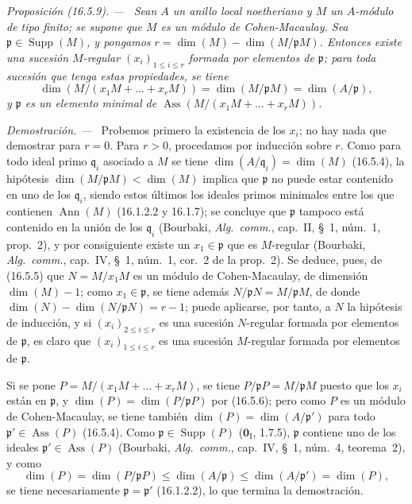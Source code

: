 \documentclass[10pt,oneside]{book}
\makeatletter
\newcommand{\setmanualcurrentlabel}[1]{\def\@currentlabel{#1}}
\newenvironment{proposition}[1][]{%
  \setmanualcurrentlabel{#1}\par\medskip\noindent\itshape Proposición (#1). ---\ }{\par}
\newenvironment{proof}{%
  \par\medskip\noindent\textit{Demostración. ---\ }}{\par}
\providecommand{\setmin}{-}%
\makeatother
\begin{document}
\begin{proposition}[16.5.9]
\label{0.16.5.9-es}
Sean $A$ un anillo local noetheriano y $M$ un $A$-módulo de tipo finito; se
supone que $M$ es un módulo de Cohen-Macaulay. Sea
$\mathfrak{p}\in\operatorname{Supp}(M)$, y pongamos
$r=\dim(M)\setmin\dim(M/\mathfrak{p}M)$. Entonces existe una sucesión $M$-regular
$(x_i)_{1\leq i\leq r}$ formada por elementos de $\mathfrak{p}$; para toda
sucesión que tenga estas propiedades, se tiene
\[
  \dim(M/(x_1M+\ldots+x_rM))
  =\dim(M/\mathfrak{p}M)=\dim(A/\mathfrak{p}),
\]
y $\mathfrak{p}$ es un elemento minimal de
$\operatorname{Ass}(M/(x_1M+\ldots+x_rM))$.
\end{proposition}

\begin{proof}
Probemos primero la existencia de los $x_i$; no hay nada que demostrar para
$r=0$. Para $r>0$, procedamos por inducción sobre $r$. Como para todo ideal
primo $\mathfrak{q}_i$ asociado a $M$ se tiene
$\dim(A/\mathfrak{q}_i)=\dim(M)$ (16.5.4), la hipótesis
$\dim(M/\mathfrak{p}M)<\dim(M)$ implica que $\mathfrak{p}$ no puede estar
contenido en uno de los $\mathfrak{q}_i$, siendo estos últimos los ideales primos
minimales entre los que contienen $\operatorname{Ann}(M)$ (16.1.2.2 y
16.1.7); se concluye que $\mathfrak{p}$ tampoco está contenido en la
unión de los $\mathfrak{q}_i$ (Bourbaki, \emph{Alg.~comm.}, cap.~II, \S~1,
núm.~1, prop.~2), y por consiguiente existe un $x_1\in\mathfrak{p}$ que es
$M$-regular (Bourbaki, \emph{Alg.~comm.}, cap.~IV, \S~1, núm.~1, cor.~2 de
la prop.~2). Se deduce, pues, de (16.5.5) que $N=M/x_1M$ es un módulo de
Cohen-Macaulay, de dimensión $\dim(M)\setmin 1$; como $x_1\in\mathfrak{p}$, se tiene
además $N/\mathfrak{p}N=M/\mathfrak{p}M$, de donde
$\dim(N)\setmin\dim(N/\mathfrak{p}N)=r\setmin 1$; puede aplicarse, por tanto, a $N$
la hipótesis de inducción, y si $(x_i)_{2\leq i\leq r}$ es una sucesión
$N$-regular formada por elementos de $\mathfrak{p}$, es claro que
$(x_i)_{1\leq i\leq r}$ es una sucesión $M$-regular formada por elementos de
$\mathfrak{p}$.

Si se pone $P=M/(x_1M+\ldots+x_rM)$, se tiene
$P/\mathfrak{p}P=M/\mathfrak{p}M$ puesto que los $x_i$ están en
$\mathfrak{p}$, y $\dim(P)=\dim(P/\mathfrak{p}P)$ por (16.5.6); pero como
$P$ es un módulo de Cohen-Macaulay, se tiene también
$\dim(P)=\dim(A/\mathfrak{p}')$ para todo
$\mathfrak{p}'\in\operatorname{Ass}(P)$ (16.5.4). Como
$\mathfrak{p}\in\operatorname{Supp}(P)$ ($\mathbf{0}_{\mathrm I}$, 1.7.5),
$\mathfrak{p}$ contiene uno de los ideales
$\mathfrak{p}'\in\operatorname{Ass}(P)$ (Bourbaki, \emph{Alg.~comm.},
cap.~IV, \S~1, núm.~4, teorema~2), y como
\[
  \dim(P)=\dim(P/\mathfrak{p}P)
  \leq\dim(A/\mathfrak{p})
  \leq\dim(A/\mathfrak{p}')=\dim(P),
\]
se tiene necesariamente $\mathfrak{p}=\mathfrak{p}'$ (16.1.2.2), lo que
termina la demostración.
\end{proof}
\end{document}
